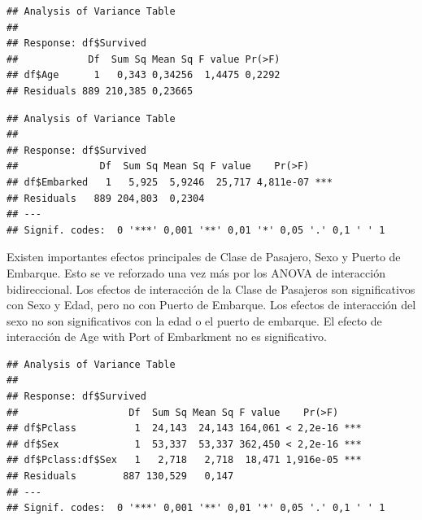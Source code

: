 \documentclass[]{article}
\newenvironment{Shaded}{\begin{snugshade}}{\end{snugshade}}
\newcommand{\KeywordTok}[1]{\textcolor[rgb]{0.13,0.29,0.53}{\textbf{#1}}}
\newcommand{\StringTok}[1]{\textcolor[rgb]{0.31,0.60,0.02}{#1}}
\newcommand{\OperatorTok}[1]{\textcolor[rgb]{0.81,0.36,0.00}{\textbf{#1}}}
\newcommand{\NormalTok}[1]{#1}
\begin{document}
\begin{verbatim}
## Analysis of Variance Table
## 
## Response: df$Survived
##            Df  Sum Sq Mean Sq F value Pr(>F)
## df$Age      1   0,343 0,34256  1,4475 0,2292
## Residuals 889 210,385 0,23665
\end{verbatim}

\begin{Shaded}
\end{Shaded}

\begin{verbatim}
## Analysis of Variance Table
## 
## Response: df$Survived
##              Df  Sum Sq Mean Sq F value    Pr(>F)    
## df$Embarked   1   5,925  5,9246  25,717 4,811e-07 ***
## Residuals   889 204,803  0,2304                      
## ---
## Signif. codes:  0 '***' 0,001 '**' 0,01 '*' 0,05 '.' 0,1 ' ' 1
\end{verbatim}

Existen importantes efectos principales de Clase de Pasajero, Sexo y
Puerto de Embarque. Esto se ve reforzado una vez más por los ANOVA de
interacción bidireccional. Los efectos de interacción de la Clase de
Pasajeros son significativos con Sexo y Edad, pero no con Puerto de
Embarque. Los efectos de interacción del sexo no son significativos con
la edad o el puerto de embarque. El efecto de interacción de Age with
Port of Embarkment no es significativo.

\begin{Shaded}
\end{Shaded}

\begin{verbatim}
## Analysis of Variance Table
## 
## Response: df$Survived
##                   Df  Sum Sq Mean Sq F value    Pr(>F)    
## df$Pclass          1  24,143  24,143 164,061 < 2,2e-16 ***
## df$Sex             1  53,337  53,337 362,450 < 2,2e-16 ***
## df$Pclass:df$Sex   1   2,718   2,718  18,471 1,916e-05 ***
## Residuals        887 130,529   0,147                      
## ---
## Signif. codes:  0 '***' 0,001 '**' 0,01 '*' 0,05 '.' 0,1 ' ' 1
\end{verbatim}
\end{document}
